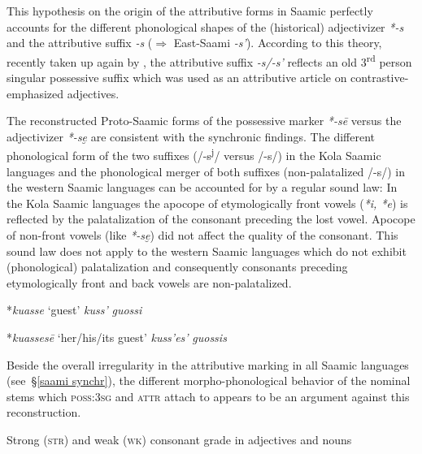 {This hypothesis on the origin of the attributive forms in Saamic perfectly accounts for the different phonological shapes of the (historical) adjectivizer \mbox{\textit{*-s}} and the attributive suffix \textit{-s} ($\Rightarrow$ East-Saami \textit{-s'}). According to this theory, recently taken up again by \cite{riesler2006b}, the attributive suffix \textit{-s/-s'} reflects an old 3\textsuperscript{rd} person singular possessive suffix which was used as an attributive article on contrastive-emphasized adjectives.

The reconstructed Proto-Saamic forms of the possessive marker \textit{*-sē} \cite[73]{sammallahti1998b} versus the adjectivizer \textit{*-se̮} are consistent with the synchronic findings. The different phonological form of the two suffixes (/-s\textsuperscript{j}/ versus /-s/) in the Kola Saamic languages and the phonological merger of both suffixes (non-palatalized /-s/) in the western Saamic languages can be accounted for by a regular sound law: In the Kola Saamic languages the apocope of etymologically front vowels (\textit{*i, *e}) is reflected by the palatalization of the consonant preceding the lost vowel. Apocope of non-front vowels (like \textit{*-se̮}) did not affect the quality of the consonant. This sound law does not apply to the western Saamic languages which do not exhibit (phonological) palatalization and consequently consonants preceding etymologically front and back vowels are non-palatalized.
\begin{exe}
\ex
\begin{xlist}
\ex
\begin{xlist}
	*\textit{kuasse} ‘guest’
	\textit{kuss'}
 \textit{guossi}
\end{xlist}
\ex
\begin{xlist}
	*\textit{kuassesē} ‘her/his/its guest’
	\textit{kuss'es'}
 \textit{guossis}
\end{xlist}
\end{xlist}
\end{exe}
Beside the overall irregularity in the attributive marking in all Saamic languages (see~\S\ref{saami synchr}), the different morpho-phonological behavior of the nominal stems which \textsc{poss:3sg} and \textsc{attr} attach to appears to be an argument against this reconstruction. 
\begin{exe}
\ex Strong (\textsc{str}) and weak (\textsc{wk}) consonant grade in adjectives and nouns

\end{exe}}
